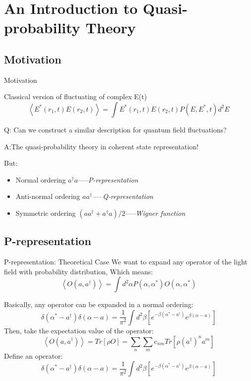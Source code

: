 \documentclass{beamer}
\begin{document}
\section{An Introduction to Quasi-probability Theory}
\subsection{Motivation}
\begin{frame}{Motivation}
\begin{block}{Classical version of fluctuating of complex E(t)}
	\[\left\langle {{E^*}\left( {{r_1},t} \right)E\left( {{r_2},t} \right)} \right\rangle  = \int {{E^*}\left( {{r_1},t} \right)E\left( {{r_2},t} \right)P\left( {E,{E^*},t} \right){d^2}E} \]
\end{block}
Q: Can we construct a similar description for quantum field fluctuations?

A:The quasi-probability theory in coherent state representation!

But: 

\begin{itemize}
	\item Normal ordering ${a^\dag }a$-----\emph{P-representation}
	\item Anti-normal ordering $a{a^\dag }$-----\emph{Q-representation}
	\item Symmetric ordering $\left( {a{a^\dag } + {a^\dag }a} \right)/2$-----\emph{Wigner function}
\end{itemize}

\end{frame}


\subsection{P-representation}
\begin{frame}{P-representation: Theoretical Case}
We want to expand any operator of the light field with probability distribution, Which means:
\[\left\langle {O\left( {a,{a^\dag }} \right)} \right\rangle  = \int {{d^2}\alpha P\left( {\alpha ,{\alpha ^*}} \right)O\left( {\alpha ,{\alpha ^ * }} \right)} \]

Basically, any operator can be expanded in a normal ordering:
\[\delta \left( {{\alpha ^*} - {a^\dag }} \right)\delta \left( {\alpha  - a} \right) = \frac{1}{{{\pi ^2}}}\int {{d^2}\beta \left[ {{e^{ - \beta \left( {{\alpha ^*} - {a^\dag }} \right)}}{e^{\beta \left( {\alpha  - a} \right)}}} \right]} \]
Then, take the expectation value of the operator:
\[\left\langle {O\left( {a,{a^\dag }} \right)} \right\rangle  = Tr\left[ {\rho O} \right] = \sum\limits_n {\sum\limits_m {{c_{nm}}Tr\left[ {\rho {{\left( {{a^\dag }} \right)}^n}{a^m}} \right]} } \]
Define an operator:
\[\delta \left( {{\alpha ^*} - {a^\dag }} \right)\delta \left( {\alpha  - a} \right) = \frac{1}{{{\pi ^2}}}\int {{d^2}\beta \left[ {{e^{ - \beta \left( {{\alpha ^*} - {a^\dag }} \right)}}{e^{\beta \left( {\alpha  - a} \right)}}} \right]} \]


\end{frame}
\end{document}
